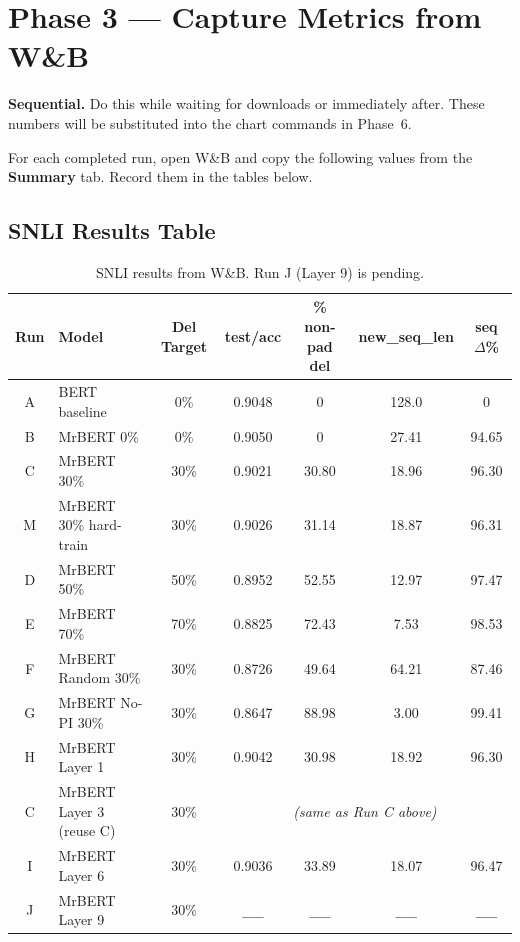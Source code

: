 \documentclass[11pt,a4paper]{article}
\newcommand{\tbd}{\textcolor{placeholder}{\texttt{\_\_\_}}}
\begin{document}
\section{Phase 3 --- Capture Metrics from W\&B}
\label{sec:phase3}

\begin{mdframed}[style=notestyle]
\textbf{Sequential.} Do this while waiting for downloads or immediately after. These numbers will be substituted into the chart commands in Phase~6.
\end{mdframed}

For each completed run, open W\&B and copy the following values from the \textbf{Summary} tab. Record them in the tables below.

\subsection{SNLI Results Table}

\begin{table}[h]
\centering
\small
\begin{tabular}{@{}clccccc@{}}
\toprule
\textbf{Run} & \textbf{Model} & \textbf{Del Target} & \textbf{test/acc} & \textbf{\% non-pad del} & \textbf{new\_seq\_len} & \textbf{seq $\Delta$\%} \\
\midrule
A & BERT baseline             & 0\%  & 0.9048 & 0       & 128.0  & 0     \\
B & MrBERT 0\%                & 0\%  & 0.9050 & 0       & 27.41  & 94.65 \\
C & MrBERT 30\%               & 30\% & 0.9021 & 30.80   & 18.96  & 96.30 \\
M & MrBERT 30\% hard-train    & 30\% & 0.9026 & 31.14   & 18.87  & 96.31 \\
D & MrBERT 50\%               & 50\% & 0.8952 & 52.55   & 12.97  & 97.47 \\
E & MrBERT 70\%               & 70\% & 0.8825 & 72.43   & 7.53   & 98.53 \\
F & MrBERT Random 30\%        & 30\% & 0.8726 & 49.64   & 64.21  & 87.46 \\
G & MrBERT No-PI 30\%         & 30\% & 0.8647 & 88.98   & 3.00   & 99.41 \\
H & MrBERT Layer 1            & 30\% & 0.9042 & 30.98   & 18.92  & 96.30 \\
C & MrBERT Layer 3 (reuse C)  & 30\% & \multicolumn{4}{c}{\emph{(same as Run C above)}} \\
I & MrBERT Layer 6            & 30\% & 0.9036 & 33.89   & 18.07  & 96.47 \\
J & MrBERT Layer 9            & 30\% & \tbd   & \tbd    & \tbd   & \tbd  \\
\bottomrule
\end{tabular}
\caption{SNLI results from W\&B. Run J (Layer 9) is pending.}
\label{tab:snli-results}
\end{table}
\end{document}
